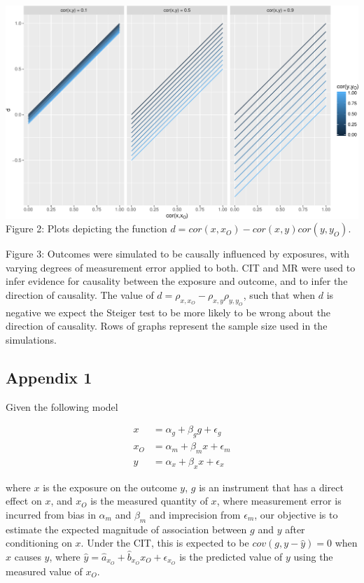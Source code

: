 \documentclass[]{article}
\begin{document}
\newpage

\includegraphics{manuscript_files/figure-latex/d_relationship_figure-1.pdf}\\
Figure 2: Plots depicting the function
\(d = cor(x, x_O) - cor(x,y)cor(y, y_O)\).

\newpage

Figure 3: Outcomes were simulated to be causally influenced by
exposures, with varying degrees of measurement error applied to both.
CIT and MR were used to infer evidence for causality between the
exposure and outcome, and to infer the direction of causality. The value
of \(d = \rho_{x, x_O} - \rho_{x,y}\rho_{y,y_O}\), such that when \(d\)
is negative we expect the Steiger test to be more likely to be wrong
about the direction of causality. Rows of graphs represent the sample
size used in the simulations.

\newpage

\subsection{Appendix 1}\label{appendix-1}

Given the following model

\[
\begin{aligned}
x & = \alpha_g + \beta_g g + \epsilon_g \\
x_O & = \alpha_m + \beta_m x + \epsilon_m \\
y & = \alpha_x + \beta_x x + \epsilon_x
\end{aligned}
\]

where \(x\) is the exposure on the outcome \(y\), \(g\) is an instrument
that has a direct effect on \(x\), and \(x_O\) is the measured quantity
of \(x\), where measurement error is incurred from bias in \(\alpha_m\)
and \(\beta_m\) and imprecision from \(\epsilon_m\), our objective is to
estimate the expected magnitude of association between \(g\) and \(y\)
after conditioning on \(x\). Under the CIT, this is expected to be
\(cov(g, y - \hat{y}) = 0\) when \(x\) causes \(y\), where
\(\hat{y} = \hat{a}_{x_O} + \hat{b}_{x_O} x_O + \epsilon_{x_O}\) is the
predicted value of \(y\) using the measured value of \(x_O\).
\end{document}
